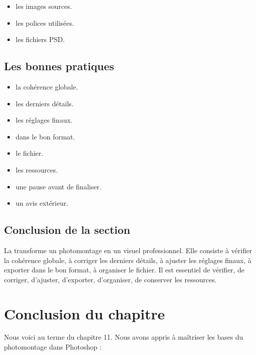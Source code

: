 \begin{itemize}
    \item {} les images sources.
    \item {} les polices utilisées.
    \item {} les fichiers PSD.
\end{itemize}

\subsection{Les bonnes pratiques}

\begin{itemize}
    \item {} la cohérence globale.
    \item {} les derniers détails.
    \item {} les réglages finaux.
    \item {} dans le bon format.
    \item {} le fichier.
    \item {} les ressources.
    \item {} une pause avant de finaliser.
    \item {} un avis extérieur.
\end{itemize}

\subsection*{Conclusion de la section}

La  transforme un photomontage en un visuel professionnel. Elle consiste à vérifier la cohérence globale, à corriger les derniers détails, à ajuster les réglages finaux, à exporter dans le bon format, à organiser le fichier. Il est essentiel de vérifier, de corriger, d'ajuster, d'exporter, d'organiser, de conserver les ressources.

\section*{Conclusion du chapitre}

Nous voici au terme du chapitre 11. Nous avons appris à maîtriser les bases du photomontage dans Photoshop :

